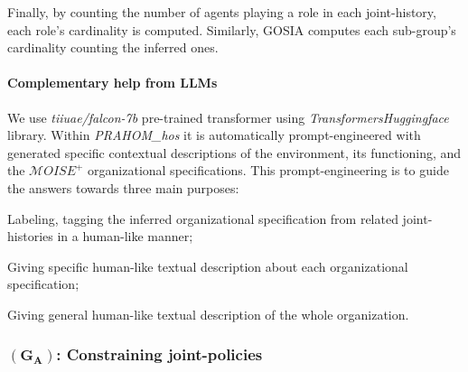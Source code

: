 \documentclass[runningheads]{llncs}
\begin{document}
Finally, by counting the number of agents playing a role in each joint-history, each role's cardinality is computed. Similarly, GOSIA computes each sub-group's cardinality counting the inferred ones.


%     


\paragraph{Complementary help from LLMs}

We use \emph{tiiuae/falcon-7b} pre-trained transformer using \emph{Transformers}\emph{Huggingface} library. Within \emph{PRAHOM\_hos} it is automatically prompt-engineered with generated specific contextual descriptions of the environment, its functioning, and the $\mathcal{M}OISE^+$ organizational specifications. This prompt-engineering is to guide the answers towards three main purposes:
\begin{enumerate*}[label=\roman*),itemjoin={;\quad}]
    \item Labeling, tagging the inferred organizational specification from related joint-histories in a human-like manner;
    \item Giving specific human-like textual description about each organizational specification;
    \item Giving general human-like textual description of the whole organization.
\end{enumerate*}



\subsubsection{\textbf{$(\mathbf{G_A})$: Constraining joint-policies}}


\end{document}
